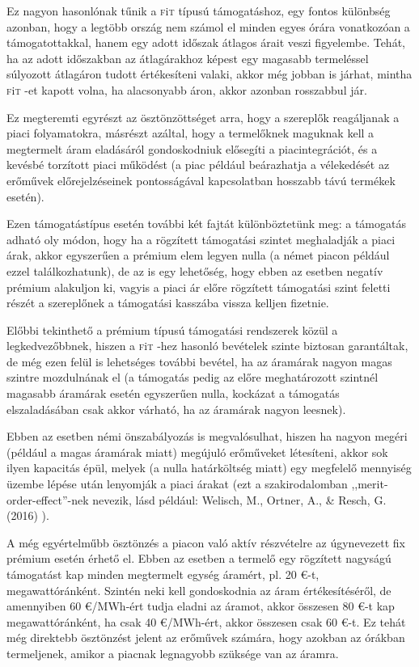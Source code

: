 \documentclass[twoside, magyar, showtrims]{corvinusphd}
\theoremstyle{plain}
\theoremstyle{remark}
\theoremstyle{definition}
\newcommand{\fit}{\textsc{f}i\textsc{t}\index{\textsc{f}i\textsc{t}} }
\begin{document}
Ez nagyon hasonlónak tűnik a \fit típusú támogatáshoz,
egy fontos különbség azonban,
hogy a legtöbb ország nem számol el 
minden egyes órára vonatkozóan a támogatottakkal,
hanem egy adott időszak átlagos árait veszi figyelembe.
Tehát, ha az adott időszakban az átlagárakhoz
képest egy magasabb termeléssel súlyozott
átlagáron tudott értékesíteni valaki, akkor még jobban is járhat, 
mintha \fit-et kapott volna,
ha alacsonyabb áron, akkor azonban rosszabbul jár.

Ez megteremti egyrészt az ösztönzöttséget arra,
hogy a szereplők reagáljanak a piaci folyamatokra,
másrészt azáltal, hogy a termelőknek maguknak 
kell a megtermelt áram eladásáról
gondoskodniuk elősegíti a piacintegrációt, és a kevésbé torzított
piaci működést (a piac például beárazhatja a vélekedését
az erőművek előrejelzéseinek pontosságával
kapcsolatban hosszabb távú termékek esetén).

Ezen támogatástípus esetén további két
fajtát különböztetünk meg:
a támogatás adható oly módon, hogy ha
a rögzített támogatási szintet meghaladják
a piaci árak, akkor egyszerűen a prémium
elem legyen nulla (a német piacon
például ezzel találkozhatunk), de az is egy
lehetőség, hogy ebben az esetben negatív prémium
alakuljon ki, vagyis a piaci ár előre rögzített támogatási szint
feletti részét a szereplőnek a támogatási kasszába vissza kelljen fizetnie.

Előbbi tekinthető a prémium típusú támogatási rendszerek közül
a legkedvezőbbnek, hiszen a \fit-hez hasonló bevételek szinte biztosan
garantáltak, de még ezen felül is lehetséges további bevétel, ha az áramárak
nagyon magas szintre mozdulnának el (a támogatás pedig az előre meghatározott
szintnél magasabb áramárak esetén egyszerűen nulla, kockázat a támogatás
elszaladásában csak akkor várható, ha az áramárak nagyon leesnek).

Ebben az esetben némi önszabályozás is megvalósulhat,
hiszen ha nagyon megéri (például a magas áramárak miatt)
megújuló erőműveket létesíteni, akkor sok ilyen kapacitás épül,
melyek (a nulla határköltség miatt) egy megfelelő mennyiség üzembe lépése
után lenyomják a piaci árakat (ezt a szakirodalomban ,,merit-order-effect''-nek nevezik,
lásd például: Welisch, M., Ortner, A., \& Resch, G. (2016) ).

A még egyértelműbb ösztönzés a piacon való aktív részvételre 
az úgynevezett fix prémium esetén érhető el.
Ebben az esetben a termelő egy rögzített
nagyságú támogatást kap minden megtermelt
egység áramért, pl. 20 €-t, megawattóránként.
Szintén neki kell gondoskodnia az áram értékesítéséről,
de amennyiben 60 €/MWh-ért tudja eladni az áramot,
akkor összesen 80 €-t kap megawattóránként,
ha csak 40 €/MWh-ért, akkor összesen csak 60 €-t.
Ez tehát még direktebb ösztönzést jelent az erőművek
számára, hogy azokban az órákban termeljenek,
amikor a piacnak legnagyobb szüksége van az áramra.
\end{document}
